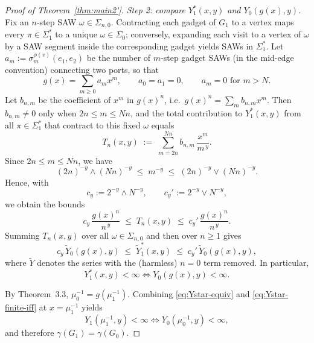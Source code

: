 \documentclass[10pt,a4paper]{amsart}
\begin{document}
\begin{proof}[Proof of Theorem~\ref{thm:main2'}]
\smallskip\noindent
\emph{Step 2: compare $Y_1^\ast(x,y)$ and $Y_0(g(x),y)$.}
Fix an $n$-step SAW $\omega\in\Sigma_{n,0}$.  Contracting each gadget of $G_1$ to a vertex
maps every $\pi\in\Sigma_1^\ast$ to a unique $\omega\in\Sigma_0$; conversely, expanding each visit
to a vertex of $\omega$ by a SAW segment inside the corresponding gadget yields SAWs in $\Sigma_1^\ast$.
Let $a_m:=\sigma^{\phi(v)}_{m}(e_1,e_2)$ be the number of $m$-step gadget SAWs (in the mid-edge convention)
connecting two ports, so that
\[
g(x)=\sum_{m\ge 0} a_m x^{m},
\qquad a_0=a_1=0,\qquad a_m=0 \text{ for } m>N.
\]
Let $b_{n,m}$ be the coefficient of $x^m$ in $g(x)^n$, i.e.\ $g(x)^n=\sum_m b_{n,m}x^m$.
Then $b_{n,m}\neq 0$ only when $2n\le m\le Nn$, and the total contribution to $Y_1^\ast(x,y)$
from all $\pi\in\Sigma_1^\ast$ that contract to this fixed $\omega$ equals
\[
T_n(x,y)\;:=\;\sum_{m=2n}^{Nn} b_{n,m}\,\frac{x^{m}}{m^{\,y}}.
\]
Since $2n\le m\le Nn$, we have
\[
(2n)^{-y}\wedge (Nn)^{-y}\;\le\; m^{-y}\;\le\;(2n)^{-y}\vee (Nn)^{-y}.
\]
Hence, with
\[
c_y := 2^{-y}\wedge N^{-y},
\qquad
c_y' := 2^{-y}\vee N^{-y},
\]
we obtain the bounds
\[
c_y\,\frac{g(x)^n}{n^{\,y}}
\;\le\;
T_n(x,y)
\;\le\;
c_y'\,\frac{g(x)^n}{n^{\,y}}.
\]
Summing $T_n(x,y)$ over all $\omega\in\Sigma_{n,0}$ and then over $n\ge 1$ gives
\begin{equation}\label{eq:Ystar-Y0-compare}
c_y\,\widetilde Y_0(g(x),y)\;\le\;\widetilde Y_1^\ast(x,y)\;\le\;c_y'\,\widetilde Y_0(g(x),y),
\end{equation}
where $\widetilde Y$ denotes the series with the (harmless) $n=0$ term removed.
In particular,
\begin{equation}\label{eq:Ystar-finite-iff}
Y_1^\ast(x,y)<\infty \iff Y_0(g(x),y)<\infty .
\end{equation}

By Theorem~3.3, $\mu_0^{-1}=g(\mu_1^{-1})$.  Combining \eqref{eq:Ystar-equiv} and \eqref{eq:Ystar-finite-iff}
at $x=\mu_1^{-1}$ yields
\[
Y_1(\mu_1^{-1},y)<\infty \iff Y_0(\mu_0^{-1},y)<\infty,
\]
and therefore $\gamma(G_1)=\gamma(G_0)$.


\end{proof}
\end{document}
